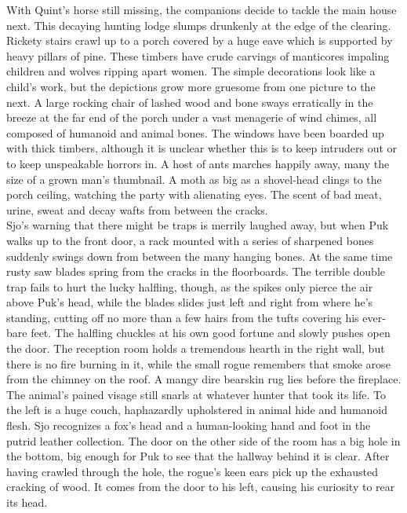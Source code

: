 With Quint's horse still missing, the companions decide to tackle the main house next. This decaying hunting lodge slumps drunkenly at the edge of the clearing. Rickety stairs crawl up to a porch covered by a huge eave which is supported by heavy pillars of pine. These timbers have crude carvings of manticores impaling children and wolves ripping apart women. The simple decorations look like a child's work, but the depictions grow more gruesome from one picture to the next. A large rocking chair of lashed wood and bone sways erratically in the breeze at the far end of the porch under a vast menagerie of wind chimes, all composed of humanoid and animal bones. The windows have been boarded up with thick timbers, although it is unclear whether this is to keep intruders out or to keep unspeakable horrors in. A host of ants marches happily away, many the size of a grown man's thumbnail. A moth as big as a shovel-head clings to the porch ceiling, watching the party with alienating eyes. The scent of bad meat, urine, sweat and decay wafts from between the cracks.\\

Sjo's warning that there might be traps is merrily laughed away, but when Puk walks up to the front door, a rack mounted with a series of sharpened bones suddenly swings down from between the many hanging bones. At the same time rusty saw blades spring from the cracks in the floorboards. The terrible double trap fails to hurt the lucky halfling, though, as the spikes only pierce the air above Puk's head, while the blades slides just left and right from where he's standing, cutting off no more than a few hairs from the tufts covering his ever-bare feet. The halfling chuckles at his own good fortune and slowly pushes open the door. The reception room holds a tremendous hearth in the right wall, but there is no fire burning in it, while the small rogue remembers that smoke arose from the chimney on the roof. A mangy dire bearskin rug lies before the fireplace. The animal's pained visage still snarls at whatever hunter that took its life. To the left is a huge couch, haphazardly upholstered in animal hide and humanoid flesh. Sjo recognizes a fox's head and a human-looking hand and foot in the putrid leather collection. The door on the other side of the room has a big hole in the bottom, big enough for Puk to see that the hallway behind it is clear. After having crawled through the hole, the rogue's keen ears pick up the exhausted cracking of wood. It comes from the door to his left, causing his curiosity to rear its head.\\

